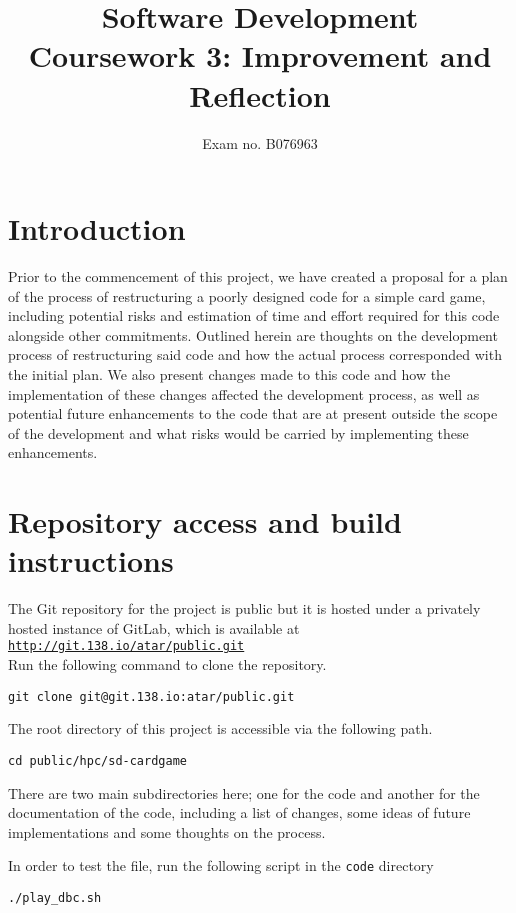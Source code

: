 \documentclass[12pt,a4paper,tightenlines]{article}
\begin{document}
\title{Software Development\\Coursework 3: Improvement and Reflection}
\author{Exam no. B076963}
\date{}
\makeEPCCtitle
\tableofcontents
\listoffigures
\listoftables
\newpage
\section{Introduction}
Prior to the commencement of this project, we have created a proposal for
a plan of the process of restructuring a poorly designed code for a simple
card game, including potential risks and estimation of time and effort
required for this code alongside other commitments.
Outlined herein are thoughts on the development process of restructuring
said code and how the actual process corresponded with the 
initial plan. We also present changes made to this code and how the 
implementation of these changes affected the development process, as 
well as potential future enhancements to the code that are at present
outside the scope of the development and what risks would be carried by
implementing these enhancements.

\section{Repository access and build instructions}
The Git repository for the project is public but it is hosted under a
privately hosted instance of GitLab, which is available at 
\texttt{\href{http://git.138.io/atar/public.git}{http://git.138.io/atar/public.git}}\\
Run the following command to clone the repository.
\begin{lstlisting}
git clone git@git.138.io:atar/public.git
\end{lstlisting}

The root directory of this project is accessible via the following 
path.
\begin{lstlisting}
cd public/hpc/sd-cardgame
\end{lstlisting}

There are two main subdirectories here; one for the code and another for 
the documentation of the code, including a list of changes, some ideas
of future implementations and some thoughts on the process.

In order to test the file, run the following script in the \texttt{code}
directory 
\begin{lstlisting}
./play_dbc.sh
\end{lstlisting}
\end{document}
